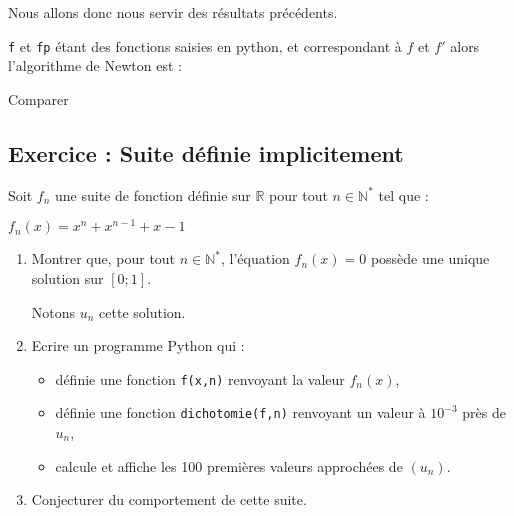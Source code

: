 \documentclass[11pt,a4paper]{article}
\renewcommand{\:}{\textbackslash}
\begin{document}
\begin{multicols}{3}
\medskip

Nous allons donc nous servir des résultats précédents.

\medskip

\texttt{f} et \texttt{fp} étant des fonctions saisies en python, et correspondant à $f$ et $f'$ alors l'algorithme de Newton est :

\medskip



\medskip\normalfont

Comparer

\vfill
\end{multicols}





\subsection*{Exercice : Suite définie implicitement}

Soit $f_n$ une suite de fonction définie sur $\mathbb R$ pour tout $n\in\mathbb N^*$ tel que :

\hfil $f_n(x)=x^n+x^{n-1}+x-1$

\begin{enumerate}
\item Montrer que, pour tout $n\in\mathbb N^*$, l'équation $f_n(x)=0$ possède une unique solution sur $[0;1]$.

\medskip

Notons $u_n$ cette solution.

\item Ecrire un programme Python qui :
\begin{itemize}
\item définie une fonction \texttt{f(x,n)} renvoyant la valeur $f_n(x)$,
\item définie une fonction \texttt{dichotomie(f,n)} renvoyant un valeur à $10^{-3}$ près de $u_n$,
\item calcule et affiche les 100 premières valeurs approchées de
$(u_n)$.
\end{itemize}

\item Conjecturer du comportement de cette suite.
\end{enumerate}
\end{document}
